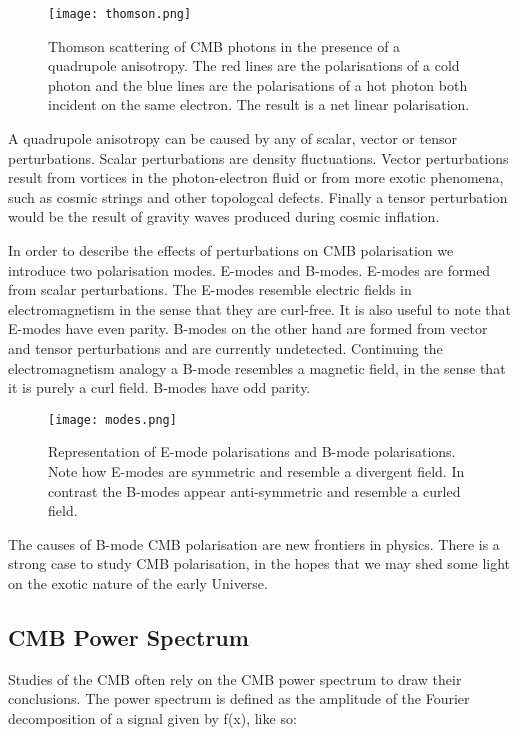 \begin{figure}[h]
\centering
\texttt{[image: thomson.png]}
\caption{Thomson scattering of CMB photons in the presence of a quadrupole anisotropy. The red lines are the polarisations of a cold photon and the blue lines are the polarisations of a hot photon both incident on the same electron. The result is a net linear polarisation.}
\label{fig:thomson}
\end{figure}
\pagebreak
A quadrupole anisotropy can be caused by any of scalar, vector or tensor perturbations. Scalar perturbations are density fluctuations. Vector perturbations result from vortices in the photon-electron fluid or from more exotic phenomena, such as cosmic strings and other topologcal defects. Finally a tensor perturbation would be the result of gravity waves produced during cosmic inflation.  

In order to describe the effects of perturbations on CMB polarisation we introduce two polarisation modes. E-modes and B-modes. E-modes are formed from scalar perturbations. The E-modes resemble electric fields in electromagnetism in the sense that they are curl-free. It is also useful to note that E-modes have even parity. B-modes on the other hand are formed from vector and tensor perturbations and are currently undetected. Continuing the electromagnetism analogy a B-mode resembles a magnetic field, in the sense that it is purely a curl field. B-modes have odd parity.

\begin{SCfigure}
\centering
\texttt{[image: modes.png]}
\caption{Representation of E-mode polarisations and B-mode polarisations. Note how E-modes are symmetric and resemble a divergent field. In contrast the B-modes appear anti-symmetric and resemble a curled field.}
\label{fig:modes}
\end{SCfigure}

The causes of B-mode CMB polarisation are new frontiers in physics. There is a strong case to study CMB polarisation, in the hopes that we may shed some light on the exotic nature of the early Universe.

\subsection{CMB Power Spectrum}

Studies of the CMB often rely on the CMB power spectrum to draw their conclusions. The power spectrum is defined as the amplitude of the Fourier decomposition of a signal given by f(x), like so:

